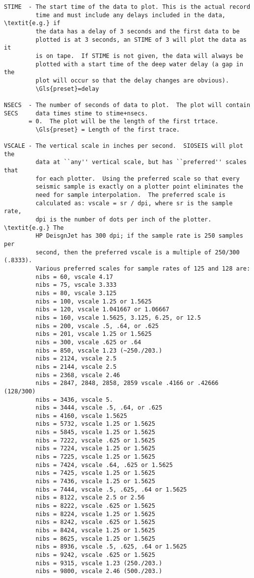 \begin{verbatim}
STIME  - The start time of the data to plot. This is the actual record
         time and must include any delays included in the data, \textit{e.g.} if
         the data has a delay of 3 seconds and the first data to be
         plotted is at 3 seconds, an STIME of 3 will plot the data as it
         is on tape.  If STIME is not given, the data will always be
         plotted with a start time of the deep water delay (a gap in the
         plot will occur so that the delay changes are obvious).
         \Gls{preset}=delay

NSECS  - The number of seconds of data to plot.  The plot will contain
SECS     data times stime to stime+nsecs.
       = 0.  The plot will be the length of the first trtace.
         \Gls{preset} = Length of the first trace.

VSCALE - The vertical scale in inches per second.  SIOSEIS will plot the
         data at ``any'' vertical scale, but has ``preferred'' scales that
         for each plotter.  Using the preferred scale so that every
         seismic sample is exactly on a plotter point eliminates the
         need for sample interpolation.  The preferred scale is
         calculated as: vscale = sr / dpi, where sr is the sample rate,
         dpi is the number of dots per inch of the plotter.  \textit{e.g.} The
         HP DeisgnJet has 300 dpi; if the sample rate is 250 samples per
         second, then the preferred vscale is a multiple of 250/300 (.8333).
         Various preferred scales for sample rates of 125 and 128 are:
         nibs = 60, vscale 4.17
         nibs = 75, vscale 3.333
         nibs = 80, vscale 3.125
         nibs = 100, vscale 1.25 or 1.5625
         nibs = 120, vscale 1.041667 or 1.06667
         nibs = 160, vscale 1.5625, 3.125, 6.25, or 12.5
         nibs = 200, vscale .5, .64, or .625
         nibs = 201, vscale 1.25 or 1.5625
         nibs = 300, vscale .625 or .64
         nibs = 850, vscale 1.23 (~250./203.)
         nibs = 2124, vscale 2.5
         nibs = 2144, vscale 2.5
         nibs = 2368, vscale 2.46
         nibs = 2847, 2848, 2858, 2859 vscale .4166 or .42666 (128/300)
         nibs = 3436, vscale 5.
         nibs = 3444, vscale .5, .64, or .625
         nibs = 4160, vscale 1.5625
         nibs = 5732, vscale 1.25 or 1.5625
         nibs = 5845, vscale 1.25 or 1.5625
         nibs = 7222, vscale .625 or 1.5625
         nibs = 7224, vscale 1.25 or 1.5625
         nibs = 7225, vscale 1.25 or 1.5625
         nibs = 7424, vscale .64, .625 or 1.5625
         nibs = 7425, vscale 1.25 or 1.5625
         nibs = 7436, vscale 1.25 or 1.5625
         nibs = 7444, vscale .5, .625, .64 or 1.5625
         nibs = 8122, vscale 2.5 or 2.56
         nibs = 8222, vscale .625 or 1.5625
         nibs = 8224, vscale 1.25 or 1.5625
         nibs = 8242, vscale .625 or 1.5625
         nibs = 8424, vscale 1.25 or 1.5625
         nibs = 8625, vscale 1.25 or 1.5625
         nibs = 8936, vscale .5, .625, .64 or 1.5625
         nibs = 9242, vscale .625 or 1.5625
         nibs = 9315, vscale 1.23 (250./203.)
         nibs = 9800, vscale 2.46 (500./203.)


\end{verbatim}
